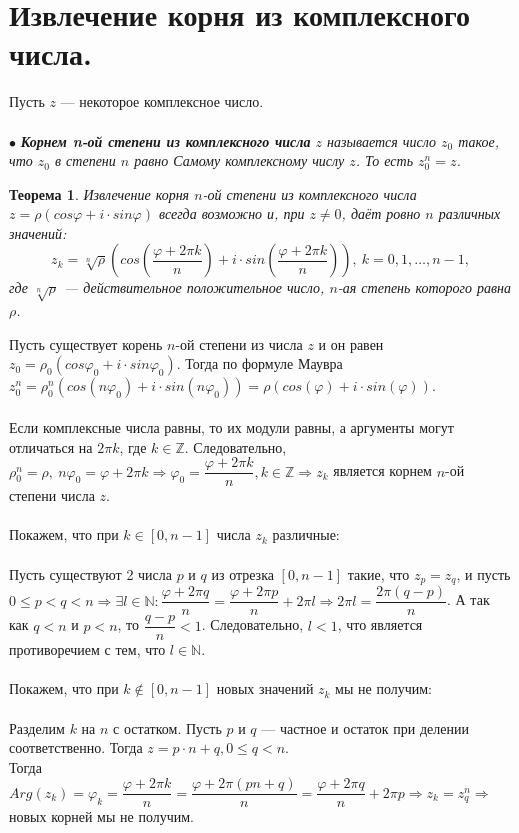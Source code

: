 \section{Извлечение корня из комплексного числа.}
Пусть $z$ --- некоторое комплексное число.\\\\
$\bullet$ \textit{\textbf{Корнем n-ой степени из комплексного числа} $z$ называется число $z_0$ такое, что $z_0$ в степени $n$ равно Самому комплексному числу $z$. То есть $z_0^n = z$.}
\newtheorem*{t6_3_1}{Теорема}\begin{t6_3_1} Извлечение корня $n$-ой степени из комплексного числа $z = \rho(cos\varphi + i\cdot sin\varphi)$ всегда возможно и, при $z\ne 0$, даёт
	ровно $n$ различных значений: $$z_k = \sqrt[n]{\rho}\left(cos\left (\dfrac{\varphi + 2\pi k}{n}\right ) + i\cdot sin\left(\dfrac{\varphi + 2\pi k}{n}\right) \right),\ k=0,1,\dots,n-1,$$
	где $\sqrt[n]{\rho}$ --- действительное положительное число, $n$-ая степень которого равна $\rho$.
\end{t6_3_1}\begin{Proof}
	Пусть существует корень $n$-ой степени из числа $z$ и он равен $z_0 = \rho_0(cos\varphi_0 + i\cdot sin\varphi_0)$. Тогда по формуле Маувра $z_0^n = \rho_0^n(cos(n\varphi_0) + i\cdot sin(n\varphi_0)) = \rho(cos(\varphi) + i\cdot sin(\varphi))$.\\\\
	Если комплексные числа равны, то их модули равны, а аргументы могут отличаться на $2\pi k$, где $k \in \mathbb{Z}$. Следовательно, $\rho_0^n = \rho,\ n\varphi_0 = \varphi + 2\pi k \Rightarrow \varphi_0 = \dfrac{\varphi + 2 \pi k}{n}, k\in \mathbb{Z}\Rightarrow z_k$ является корнем $n$-ой степени числа $z$.\\\\
	Покажем, что при $k\in [0, n-1]$ числа $z_k$ различные:\\\\
	Пусть существуют 2 числа $p$ и $q$ из отрезка $[0, n-1]$ такие, что $z_p = z_q$, и пусть $0\leqslant p < q < n\Rightarrow \exists l \in \mathbb{N} : \dfrac{\varphi + 2\pi q}{n} = \dfrac{\varphi + 2\pi p}{n} + 2\pi l\Rightarrow 2 \pi l = \dfrac{2\pi ( q - p)}{n}$. А так как $q < n$ и $p < n$, то $\dfrac{q-p}{n} < 1$. Следовательно, $l < 1$, что является противоречием с тем, что $l \in \mathbb{N}$.\\\\
	Покажем, что при $k \not\in [0, n-1]$ новых значений $z_k$ мы не получим:\\\\
	Разделим $k$ на $n$ с остатком. Пусть $p$ и $q$ --- частное и остаток при делении соответственно. Тогда $z = p \cdot n + q, 0 \leqslant q < n$.\\
	Тогда $Arg(z_k) = \varphi_k = \dfrac{\varphi + 2\pi k}{n} = \dfrac{\varphi + 2\pi (p n + q)}{n} = \dfrac{\varphi + 2\pi q}{n} + 2\pi p \Rightarrow z_k = z_q^n\Rightarrow$ новых корней мы не получим.
\end{Proof}
